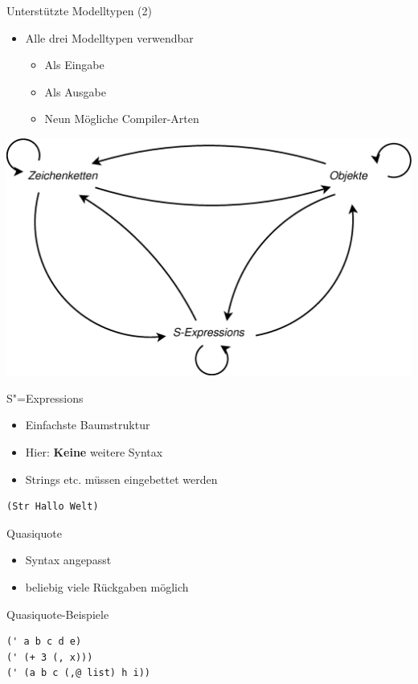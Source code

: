 \documentclass{beamer}
\newcommand{\pfeil}{\item[$\Rightarrow$]}
\newcommand{\sexps}{S"=Expressions}
\begin{document}
\begin{frame}{Unterstützte Modelltypen (2)}
  \begin{itemize}
  \item Alle drei Modelltypen verwendbar
    \begin{itemize}
    \item Als Eingabe
    \item Als Ausgabe
    \pfeil Neun Mögliche Compiler-Arten
    \end{itemize}
  \end{itemize}
  \includegraphics[scale=0.25]{images/magicl_model_poss}
\end{frame}

\begin{frame}[fragile]{\sexps}
  \begin{itemize}
  \item Einfachste Baumstruktur
  \item Hier: \textbf{Keine} weitere Syntax
  \pfeil Strings etc. müssen eingebettet werden
  \end{itemize}
\begin{verbatim}
(Str Hallo Welt)
\end{verbatim}
\end{frame}

\begin{frame}[fragile]{Quasiquote}
  \begin{itemize}
  \item Syntax angepasst
  \item beliebig viele Rückgaben möglich
  \end{itemize}
  \begin{block}{Quasiquote-Beispiele}
\begin{verbatim}
(' a b c d e)
(' (+ 3 (, x)))
(' (a b c (,@ list) h i))  
\end{verbatim}
  \end{block}
\end{frame}
\end{document}
